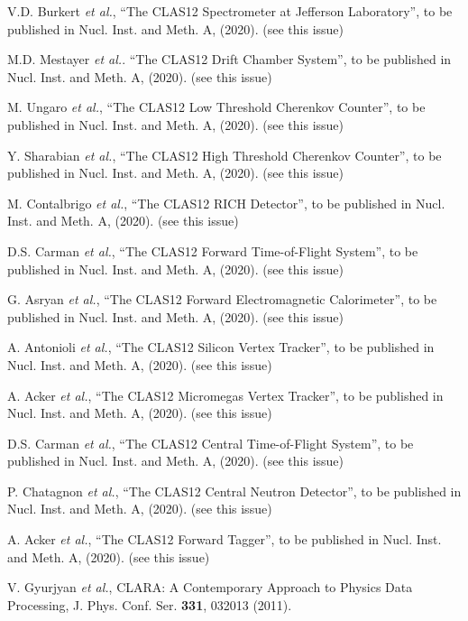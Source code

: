 \documentclass[3p,times,twocolumn]{elsarticle}
\begin{document}
\begin{thebibliography}{99}

V.D. Burkert {\it et al.}, ``The CLAS12 Spectrometer at Jefferson Laboratory'', to be published in Nucl.
Inst. and Meth. A, (2020). (see this issue)

M.D. Mestayer {\it et al.}. ``The CLAS12 Drift Chamber System'', to be published in Nucl. Inst. and
Meth. A, (2020). (see this issue)

M. Ungaro {\it et al.}, ``The CLAS12 Low Threshold Cherenkov Counter'', to be published in Nucl. Inst.
and Meth. A, (2020). (see this issue)

Y. Sharabian {\it et al.}, ``The CLAS12 High Threshold Cherenkov Counter'', to be published in Nucl. Inst.
and Meth. A, (2020). (see this issue)
  
M. Contalbrigo {\it et al.}, ``The CLAS12 RICH Detector'', to be published in Nucl. Inst. and
Meth. A, (2020). (see this issue)

D.S. Carman {\it et al.},   ``The CLAS12 Forward Time-of-Flight System'', to be published in Nucl.
Inst. and Meth. A, (2020). (see this issue)

G. Asryan {\it et al.}, ``The CLAS12 Forward Electromagnetic Calorimeter'', to be published in Nucl. Inst. and
Meth. A, (2020). (see this issue)

A. Antonioli {\it et al.}, ``The CLAS12 Silicon Vertex Tracker'', to be published in Nucl. Inst. and
Meth. A, (2020). (see this issue)

A. Acker {\it et al.}, ``The CLAS12 Micromegas Vertex Tracker'', to be published in Nucl. Inst. and
Meth. A, (2020). (see this issue)

D.S. Carman {\it et al.}, ``The CLAS12 Central Time-of-Flight System'', to be published in Nucl.
Inst. and Meth. A, (2020). (see this issue)

P. Chatagnon {\it et al.}, ``The CLAS12 Central Neutron Detector'', to be published in Nucl. Inst. and
Meth. A, (2020). (see this issue)

A. Acker {\it et al.}, ``The CLAS12 Forward Tagger'', to be published in Nucl. Inst. and
Meth. A, (2020). (see this issue)

V. Gyurjyan {\it et al.}, CLARA: A Contemporary Approach to Physics Data Processing, J. Phys. Conf. Ser.
{\bf 331}, 032013 (2011).


\end{thebibliography}
\end{document}

